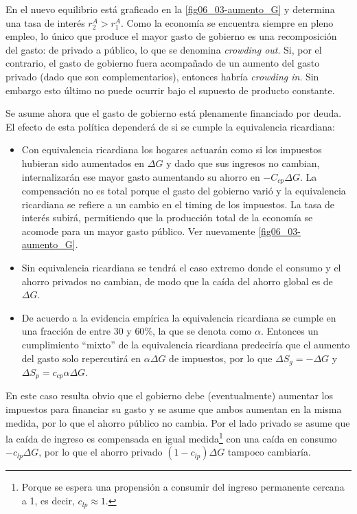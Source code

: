 \documentclass[DeGregorioResumen]{subfiles}
\begin{document}
En el nuevo equilibrio está graficado en la \autoref{fig06_03-aumento_G} y determina una tasa de interés $r_2^A > r_1^A$. Como la economía se encuentra siempre en pleno empleo, lo único que produce el mayor gasto de gobierno es una recomposición del gasto: de privado a público, lo que se denomina \emph{crowding out}. Si, por el contrario, el gasto de gobierno fuera acompañado de un aumento del gasto privado (dado que son complementarios), entonces habría \emph{crowding in}. Sin embargo esto último no puede ocurrir bajo el supuesto de producto constante.


Se asume ahora que el gasto de gobierno está plenamente financiado por deuda. El efecto de esta política dependerá de si se cumple la equivalencia ricardiana:

\begin{itemize}
\item Con equivalencia ricardiana los hogares actuarán como si los impuestos hubieran sido aumentados en $\Delta G$ y dado que sus ingresos no cambian, internalizarán ese mayor gasto aumentando su ahorro en $-C_{cp}\Delta G$. La compensación no es total porque el gasto del gobierno varió y la equivalencia ricardiana se refiere a un cambio en el timing de los impuestos. La tasa de interés subirá, permitiendo que la producción total de la economía se acomode para un mayor gasto público. Ver nuevamente \autoref{fig06_03-aumento_G}.

\item Sin equivalencia ricardiana se tendrá el caso extremo donde el consumo y el ahorro privados no cambian, de modo que la caída del ahorro global es de $\Delta G $.

\item De acuerdo a la evidencia empírica la equivalencia ricardiana se cumple en una fracción de entre 30 y $60\%$, la que se denota como $\alpha$. Entonces un cumplimiento ``mixto'' de la equivalencia ricardiana predeciría que el aumento del gasto solo repercutirá en $\alpha \Delta G$ de impuestos, por lo que $\Delta S_g = -\Delta G $ y $\Delta S_p = c_{cp}\alpha \Delta G $.
\end{itemize}


En este caso resulta obvio que el gobierno debe (eventualmente) aumentar los impuestos para financiar su gasto y se asume que ambos aumentan en la misma medida, por lo que el ahorro público no cambia. Por el lado privado se asume que la caída de ingreso es compensada en igual medida\footnote{Porque se espera una propensión a consumir del ingreso permanente cercana a 1, es decir, $c_{lp}\approx 1$.} con una caída en consumo $-c_{lp}\Delta G$, por lo que el ahorro privado $(1-c_{lp})\Delta G$ tampoco cambiaría.
\end{document}
